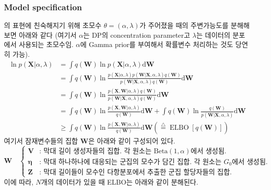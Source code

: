 \documentclass{article}
\begin{document}
\subsubsection{Model specification}
\cite{blei2006}의 표현에 친숙해지기 위해 초모수 $\theta=(\alpha,\lambda)$가 주어졌을 때의 주변가능도를 분해해보면 아래와 같다
(여기서 $\alpha$는 DP의 concentration parameter고 $\lambda$는 데이터의 분포에서 사용되는 초모수임. $\alpha$에 Gamma prior를 부여해서 확률변수 처리하는 것도 당연히 가능).
\begin{align*}
    \ln p(\textbf{X}|\alpha,\lambda)&=\int q(\textbf{W})\ln p(\textbf{X}|\alpha,\lambda)\text{d}\textbf{W}\\
    &=\int q(\textbf{W})\ln\frac{p(\textbf{X}|\alpha,\lambda)p(\textbf{W}|\textbf{X},\alpha,\lambda)q(\textbf{W})}{p(\textbf{W}|\textbf{X},\alpha,\lambda)q(\textbf{W})}\text{d}\textbf{W}\\
    &=\int q(\textbf{W})\ln\frac{p(\textbf{X},\textbf{W}|\alpha,\lambda)q(\textbf{W})}{p(\textbf{W}|\textbf{X},\alpha,\lambda)q(\textbf{W})}\text{d}\textbf{W}\\
    &=\int q(\textbf{W})\ln\frac{p(\textbf{X},\textbf{W}|\alpha,\lambda)}{q(\textbf{W})}\text{d}\textbf{W}+\int q(\textbf{W})\ln\frac{q(\textbf{W})}{p(\textbf{W}|\textbf{X},\alpha,\lambda)}\text{d}\textbf{W}\\
    &\geq \int q(\textbf{W})\ln\frac{p(\textbf{X},\textbf{W}|\alpha,\lambda)}{q(\textbf{W})}\text{d}\textbf{W}\left(\stackrel{\triangle}{=}\operatorname{ELBO}[q(\textbf{W})]\right)
\end{align*}
여기서 잠재변수들의 집합 $\textbf{W}$은 아래와 같이 구성되어 있다.
\begin{equation*}
    \textbf{W}\quad\left\{\begin{array}{cl}
        \mathbf{V} & \text{: 막대 길이 생성자들의 집합. 각 원소는 Beta}(1,\alpha)\text{에서 생성됨.}\\
        \boldsymbol{\eta} & \text{: 막대 하나하나에 대응되는 군집의 모수가 담긴 집합. 각 원소는 }G_0\text{에서 생성됨.}\\
        \mathbf{Z} & \text{: 막대 길이들이 모수인 다항분포에서 추출한 군집 할당자들의 집합.}
    \end{array}
    \right.
\end{equation*}
이에 따라, $N$개의 데이터가 있을 때 ELBO는 아래와 같이 분해된다.
\end{document}
